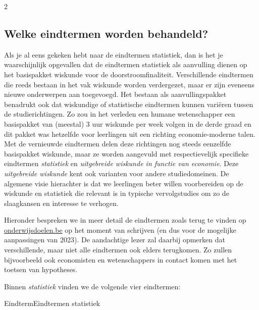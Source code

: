 \begin{multicols}{2}
        \subsection*{Welke eindtermen worden behandeld?}
        Als je al eens gekeken hebt naar de eindtermen statistiek, dan is het je waarschijnlijk opgevallen dat de eindtermen statistiek als aanvulling dienen op het basispakket wiskunde voor de doorstroomfinaliteit. Verschillende eindtermen die reeds bestaan in het vak wiskunde worden verdergezet, maar er zijn eveneens nieuwe onderwerpen aan toegevoegd. Het bestaan als aanvullingspakket benadrukt ook dat wiskundige of statistische eindtermen kunnen vari\"eren tussen de studierichtingen. Zo zou in het verleden een humane wetenschapper een basispakket van (meestal) 3 uur wiskunde per week volgen in de derde graad en dit pakket was hetzelfde voor leerlingen uit een richting economie-moderne talen. Met de vernieuwde eindtermen delen deze richtingen nog steeds eenzelfde basispakket wiskunde, maar ze worden aangevuld met respectievelijk specifieke eindtermen \emph{statistiek} en  \emph{uitgebreide wiskunde in functie van economie}. Deze \emph{uitgebreide wiskunde} kent ook varianten voor andere studiedomeinen. De algemene visie hierachter is dat we leerlingen beter willen voorbereiden op de wiskunde en statistiek die relevant is in typische vervolgstudies om zo de slaagkansen en interesse te verhogen. 
        
        Hieronder bespreken we in meer detail de eindtermen zoals terug te vinden op \url{onderwijsdoelen.be} op het moment van schrijven (en dus voor de mogelijke aanpassingen van 2023). De aandachtige lezer zal daarbij opmerken dat verschillende, maar niet alle eindtermen ook elders terugkomen. Zo zullen bijvoorbeeld ook economisten en wetenschappers in contact komen met het toetsen van hypotheses.        

        Binnen \emph{statistiek} vinden we de volgende vier eindtermen:
 \begin{kader}{Eindterm}{Eindtermen statistiek}

        
        \begin{itemize}
        

\end{itemize}
\end{kader}
\end{multicols}
